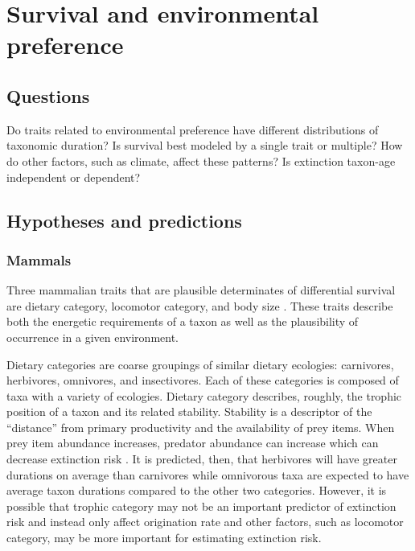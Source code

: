 \documentclass[12pt,letterpaper]{article}
\begin{document}
\section{Survival and environmental preference}
\subsection{Questions}
Do traits related to environmental preference have different distributions of taxonomic duration? Is survival best modeled by a single trait or multiple? How do other factors, such as climate, affect these patterns? Is extinction taxon-age independent or dependent?

\subsection{Hypotheses and predictions}
\subsubsection{Mammals}
Three mammalian traits that are plausible determinates of differential survival are dietary category, locomotor category, and body size \citep{Price2012,Smith2004,Jernvall2004,Janis1993a,Blois2009,Liow2008,Alroy2000g,Johnson2002b}. These traits describe both the energetic requirements of a taxon as well as the plausibility of occurrence in a given environment.

Dietary categories are coarse groupings of similar dietary ecologies: carnivores, herbivores, omnivores, and insectivores. Each of these categories is composed of taxa with a variety of ecologies. Dietary category describes, roughly, the trophic position of a taxon and its related stability. Stability is a descriptor of the ``distance'' from primary productivity and the availability of prey items. When prey item abundance increases, predator abundance can increase \citep{VanValen1989,Brown1987,Damuth1979,Silva1997,Janis2000} which can decrease extinction risk \citep{Jernvall2004,Brown1984,Jernvall2002,Fortelius2002}. It is predicted, then, that herbivores will have greater durations on average than carnivores while omnivorous taxa are expected to have average taxon durations compared to the other two categories. However, it is possible that trophic category may not be an important predictor of extinction risk and instead only affect origination rate \citep{Price2012} and other factors, such as locomotor category, may be more important for estimating extinction risk.
\end{document}
